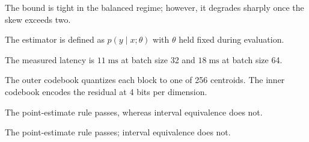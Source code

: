 The bound is tight in the balanced regime; however, it degrades sharply once the skew exceeds two.

The estimator is defined as $p(y \mid x; \theta)$ with $\theta$ held fixed during evaluation.

The measured latency is $11\;\mathrm{ms}$ at batch size 32 and $18\;\mathrm{ms}$ at batch size 64.

The outer codebook quantizes each block to one of 256 centroids. The inner codebook encodes the residual at 4 bits per dimension.

The point-estimate rule passes, whereas interval equivalence does not.

The point-estimate rule passes; interval equivalence does not.
